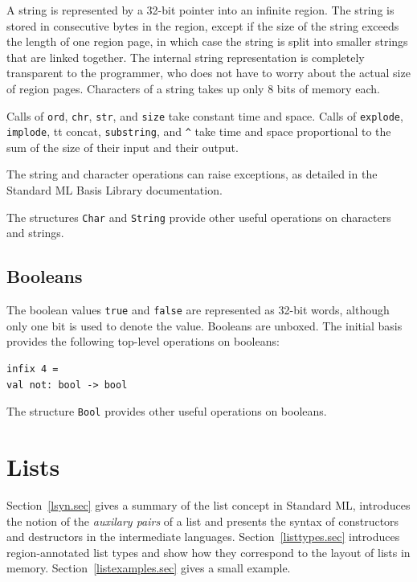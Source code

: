 \documentclass[12pt]{book}
\begin{document}
A string is represented by a 32-bit pointer into an infinite region.
The string is stored in consecutive bytes in the region, except if the
size of the string exceeds the length of one region page, in which
case the string is split into smaller strings that are linked
together. The internal string representation is completely transparent
to the programmer, who does not have to worry about the actual size of
region pages. Characters of a string takes up only 8 bits of
memory each.

Calls of {\tt ord}, {\tt chr}, {\tt str}, and {\tt size} take constant
time and space.  Calls of {\tt explode}, {\tt implode}, {tt concat},
{\tt substring}, and \verb+^+ take time and space proportional to the
sum of the size of their input and their output.

The string and character operations can raise exceptions, as detailed in the
Standard ML Basis Library documentation.

The structures {\tt Char} and {\tt String} provide other useful
operations on characters and strings.

\section{Booleans}
The boolean values {\tt true} and {\tt false} are represented as
32-bit words, although only one bit is used to denote the value.
Booleans are unboxed. The initial basis provides
the following top-level operations on booleans:\index{{\tt
    =}}
\begin{verbatim}
infix 4 =
val not: bool -> bool
\end{verbatim}
The structure {\tt Bool} provides other useful operations on booleans.

%
\chapter{Lists}
\label{lists.sec}
%
Section~\ref{lsyn.sec} gives
a summary of the list concept in Standard ML, introduces
the notion of the {\em auxilary pairs} of a list and presents the
syntax of constructors and destructors in the intermediate languages.
Section~\ref{listtypes.sec} introduces region-annotated list types and
show how they correspond to the layout of lists in memory. 
Section~\ref{listexamples.sec} gives a small example.
\end{document}
